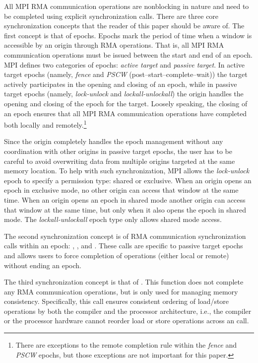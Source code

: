 All MPI RMA communication operations are nonblocking in nature and
need to be completed using explicit synchronization calls.  There are
three core synchronization concepts that the reader of this paper
should be aware of.  The first concept is that of epochs.  Epochs mark
the period of time when a window is accessible by an origin through
RMA operations.  That is, all MPI RMA communication operations must be
issued between the start and end of an epoch.  MPI defines two
categories of epochs: \emph{active target} and \emph{passive target}.
In active target epochs (namely, \emph{fence} and \emph{PSCW}
(post--start--complete--wait)) the target actively participates in the
opening and closing of an epoch, while in passive target epochs
(namely, \emph{lock-unlock} and \emph{lockall-unlockall}) the origin
handles the opening and closing of the epoch for the target.  Loosely
speaking, the closing of an epoch ensures that all MPI RMA
communication operations have completed both locally and
remotely.\footnote{There are exceptions to the remote completion rule
  within the \emph{fence} and \emph{PSCW} epochs, but those exceptions
  are not important for this paper.}

Since the origin completely handles the epoch management without any
coordination with other origins in passive target epochs, the user has
to be careful to avoid overwriting data from multiple origins
targeted at the same memory location.  To help with such
synchronization, MPI allows the \emph{lock-unlock} epoch to specify a
permission type: shared or exclusive.  When an origin opens an epoch
in exclusive mode, no other origin can access that window at the same
time.  When an origin opens an epoch in shared mode another origin can
access that window at the same time, but only when it also opens the
epoch in shared mode.  The \emph{lockall-unlockall} epoch type only
allows shared mode access.

The second synchronization concept is of RMA communication
synchronization calls within an epoch: ,
,  and
.  These calls are specific to passive
target epochs and allows users to force completion of operations
(either local or remote) without ending an epoch.

The third synchronization concept is that of .
This function does not complete any RMA communication operations, but
is only used for managing memory consistency.  Specifically, this call
ensures consistent ordering of load/store operations by both the
compiler and the processor architecture, i.e., the compiler or the
processor hardware cannot reorder load or store operations across an
 call.

